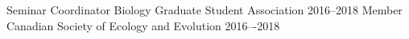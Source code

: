 
\vspace{7pt}

Seminar Coordinator Biology Graduate Student Association \hfill{2016--2018}\newline
Member Canadian Society of Ecology and Evolution \hfill{2016–-2018}
